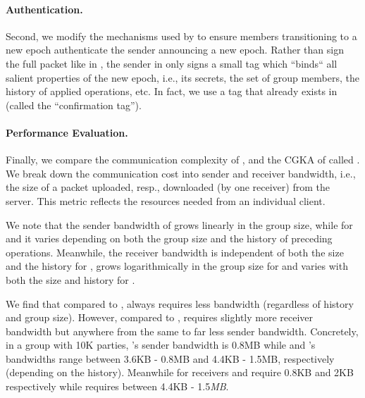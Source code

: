 \paragraph{Authentication.}
Second, we modify the mechanisms used by \protITK to ensure members
transitioning to a new epoch authenticate the sender announcing a new epoch.
Rather than sign the full packet like in \protITK, the sender in \saik only
signs a small tag which ``binds`` all salient properties of the new epoch, i.e., its
secrets, the set of group members, the history of applied operations, etc.
In fact, we use a tag that already exists in \protITK (called the 
``confirmation tag'').

%


\paragraph{Performance Evaluation.}
Finally, we compare the communication complexity of \saik, \protITK and the CGKA of
\cite{hashimoto2021cmpke} called \protCMPKE. We break down the communication cost into sender and receiver bandwidth, i.e., the size of a packet uploaded, resp., downloaded (by one receiver) from the server. This metric reflects the resources needed from an individual client.

We note that the sender bandwidth of \protCMPKE grows linearly in the group size, while for \saik and \protITK it varies depending on both the group size and the history of preceding operations. Meanwhile, the receiver bandwidth is independent of both the size and the history for \protCMPKE, grows logarithmically in the group size for \saik and varies with both the size and history for \protITK.

We find that compared to \protITK, \saik always requires less bandwidth (regardless of history and group size). However, compared to \protCMPKE, \saik requires slightly more receiver bandwidth but anywhere from the same to far less sender bandwidth. Concretely, in a group with 10K parties, \protCMPKE's sender bandwidth is 0.8MB while \saik and \protITK's bandwidths range between 3.6KB - 0.8MB and 4.4KB - 1.5MB, respectively (depending on the history). Meanwhile for receivers \protCMPKE and \saik require 0.8KB and 2KB respectively while \protITK requires between 4.4KB - 1.5\emph{MB}.

